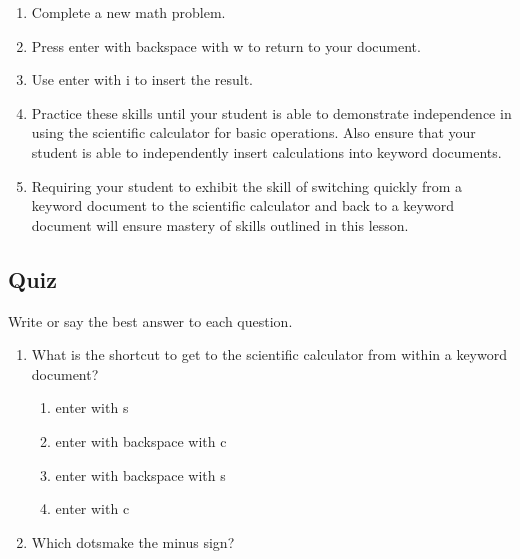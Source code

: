 \documentclass[10pt,letterpaper,twoside]{report}
\begin{document}
{{{{\begin{enumerate}
\begin{enumerate}
		      \item Complete a new math problem.
		            
		      \item Press enter with backspace with w to return to your document.
		            
		      \item Use enter with i to insert the result.
		            
		      \item Practice these skills until your student is able to demonstrate independence in using the scientific calculator for basic operations.  Also ensure that your student is able to independently insert calculations into keyword documents.
		            
		      \item Requiring your student to exhibit the skill of switching quickly from a keyword document to the scientific calculator and back to a keyword document will ensure mastery of skills outlined in this lesson.
	      \end{enumerate}
\end{enumerate}





\clearpage
\subsection{Quiz}



Write or say the best answer to each question.



\begin{enumerate}
	\item What is the shortcut to get to the scientific calculator from within a keyword document?
	      
	      \begin{enumerate}
		      \item enter with s
		            
		      \item enter with backspace with c
		            
		      \item enter with backspace with s
		            
		      \item enter with c
		            
		            
	      \end{enumerate}
	\item Which dotsmake the minus sign?
	      

\end{enumerate}}}}}
\end{document}
